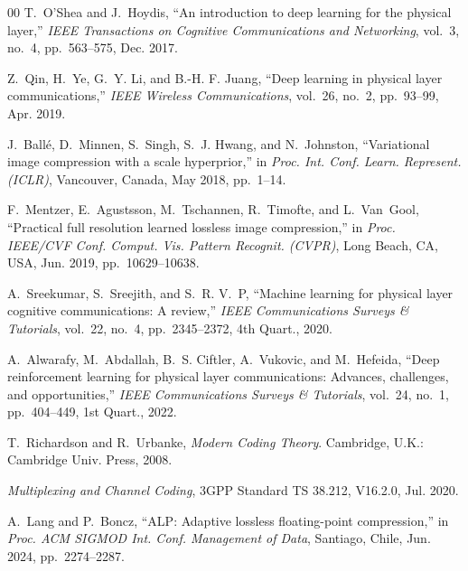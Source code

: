 \documentclass[conference]{IEEEtran}
\begin{document}
\begin{thebibliography}{00}
T.~O'Shea and J.~Hoydis, ``An introduction to deep learning for the physical layer,'' \textit{IEEE Transactions on Cognitive Communications and Networking}, vol.~3, no.~4, pp.~563--575, Dec. 2017.

Z.~Qin, H.~Ye, G.~Y. Li, and B.-H. F. Juang, ``Deep learning in physical layer communications,'' \textit{IEEE Wireless Communications}, vol.~26, no.~2, pp.~93--99, Apr. 2019.

J.~Ball{\'e}, D.~Minnen, S.~Singh, S.~J. Hwang, and N.~Johnston, ``Variational image compression with a scale hyperprior,'' in \textit{Proc. Int. Conf. Learn. Represent. (ICLR)}, Vancouver, Canada, May 2018, pp.~1--14.

F.~Mentzer, E.~Agustsson, M.~Tschannen, R.~Timofte, and L.~Van~Gool, ``Practical full resolution learned lossless image compression,'' in \textit{Proc. IEEE/CVF Conf. Comput. Vis. Pattern Recognit. (CVPR)}, Long Beach, CA, USA, Jun. 2019, pp.~10629--10638.

A.~Sreekumar, S.~Sreejith, and S.~R. V.~P, ``Machine learning for physical layer cognitive communications: A review,'' \textit{IEEE Communications Surveys \& Tutorials}, vol.~22, no.~4, pp.~2345--2372, 4th Quart., 2020.

A.~Alwarafy, M.~Abdallah, B.~S. Ciftler, A.~Vukovic, and M.~Hefeida, ``Deep reinforcement learning for physical layer communications: Advances, challenges, and opportunities,'' \textit{IEEE Communications Surveys \& Tutorials}, vol.~24, no.~1, pp.~404--449, 1st Quart., 2022.

T.~Richardson and R.~Urbanke, \textit{Modern Coding Theory}. Cambridge, U.K.: Cambridge Univ. Press, 2008.

\textit{Multiplexing and Channel Coding}, 3GPP Standard TS 38.212, V16.2.0, Jul. 2020.

A.~Lang and P.~Boncz, ``ALP: Adaptive lossless floating-point compression,'' in \textit{Proc. ACM SIGMOD Int. Conf. Management of Data}, Santiago, Chile, Jun. 2024, pp.~2274--2287.

\end{thebibliography}
\end{document}
